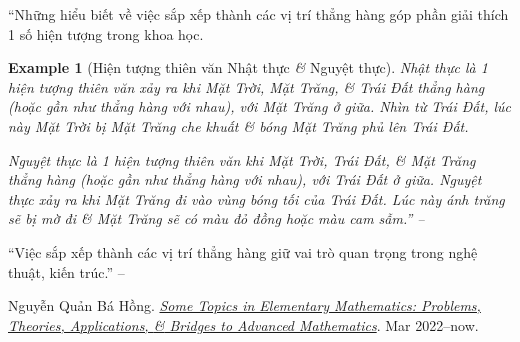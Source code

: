 \documentclass[oneside]{book}
\numberwithin{equation}{section}
\newtheorem{example}{Example}[section]
\begin{document}
``Những hiểu biết về việc sắp xếp thành các vị trí thẳng hàng góp phần giải thích 1 số hiện tượng trong khoa học.

\begin{example}[Hiện tượng thiên văn Nhật thực \textit{\&} Nguyệt thực]
	\emph{Nhật thực} là 1 hiện tượng thiên văn xảy ra khi Mặt Trời, Mặt Trăng, \textit{\&} Trái Đất thẳng hàng (hoặc gần như thẳng hàng với nhau), với Mặt Trăng ở giữa. Nhìn từ Trái Đất, lúc này Mặt Trời bị Mặt Trăng che khuất \textit{\&} bóng Mặt Trăng phủ lên Trái Đất.
	
	\emph{Nguyệt thực} là 1 hiện tượng thiên văn khi Mặt Trời, Trái Đất, \textit{\&} Mặt Trăng thẳng hàng (hoặc gần như thẳng hàng với nhau), với Trái Đất ở giữa. Nguyệt thực xảy ra khi Mặt Trăng đi vào vùng bóng tối của Trái Đất. Lúc này ánh trăng sẽ bị mờ đi \textit{\&} Mặt Trăng sẽ có màu đỏ đồng hoặc màu cam sẫm.'' -- \cite[p. 105]{Thai_Anh_Dat_Ha_Loan_Nam_Quang_Toan_6_tap_2}
\end{example}
``Việc sắp xếp thành các vị trí thẳng hàng giữ vai trò quan trọng trong nghệ thuật, kiến trúc.'' -- \cite[p. 106]{Thai_Anh_Dat_Ha_Loan_Nam_Quang_Toan_6_tap_2}


\begin{thebibliography}{99}
	 Nguyễn Quản Bá Hồng. \href{https://github.com/NQBH/hobby/blob/master/elementary_mathematics/NQBH_elementary_mathematics.pdf}{\textit{Some Topics in Elementary Mathematics: Problems, Theories, Applications, \textit{\&} Bridges to Advanced Mathematics}}. Mar 2022--now.
\end{thebibliography}


\printbibliography[heading=bibintoc]
	
\end{document}

